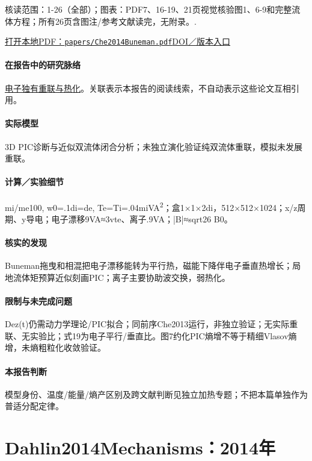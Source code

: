 \documentclass[UTF8,a4paper,11pt,openany,fontset=fandol]{ctexbook}
\begin{document}
\textsf{核读范围：}1-26（全部）；\textsf{图表：}PDF7、16-19、21页视觉核验图1、6-9和完整流体方程；所有26页含图注/参考文献读完，无附录。.

\href{run:../papers/Che2014Buneman.pdf}{打开本地PDF：\texttt{papers/Che2014Buneman.pdf}}\quad\href{https://doi.org/10.1063/1.4882677}{DOI／版本入口}

\paragraph{在报告中的研究脉络}\hyperref[story:energy]{电子独有重联与热化}。关联表示本报告的阅读线索，不自动表示这些论文互相引用。

\paragraph{实际模型}3D PIC诊断与近似双流体闭合分析；未独立演化验证纯双流体重联，模拟未发展重联。

\paragraph{计算／实验细节}mi/me100, w0=.1di=de, Te=Ti=.04miVA\textsuperscript{2}；盒1×1×2di，512×512×1024；x/z周期、y导电；电子漂移9VA≈3vte、离子.9VA；|B|≈sqrt26 B0。

\paragraph{核实的发现}Buneman拖曳和相混把电子漂移能转为平行热，磁能下降伴电子垂直热增长；局地流体矩预算近似刻画PIC；离子主要协助波交换，弱热化。

\paragraph{限制与未完成问题}Dez(t)仍需动力学理论/PIC拟合；同前序Che2013运行，非独立验证；无实际重联、无实验比；式19为电子平行/垂直比。图7约化PIC熵增不等于精细Vlasov熵增，未熵粗粒化收敛验证。

\paragraph{本报告判断}模型身份、温度/能量/熵产区别及跨文献判断见独立加热专题；不把本篇单独作为普适分配定律。

\section{Dahlin2014Mechanisms：2014年}\label{paper:Dahlin2014Mechanisms}
\end{document}
